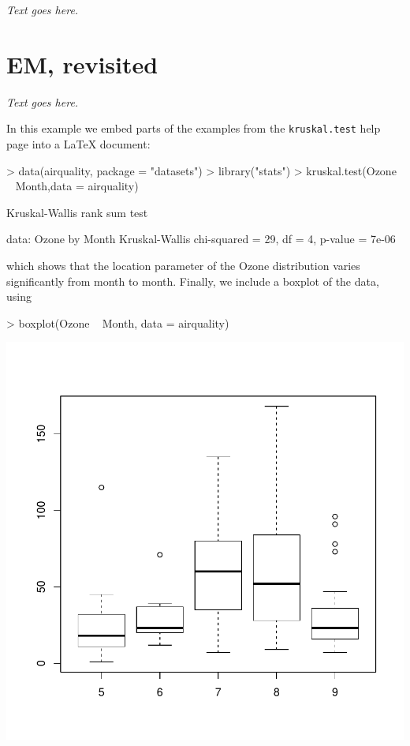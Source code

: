 \documentclass[final]{siamart171218}
\begin{document}
{\em Text goes here.}

\section{EM, revisited}

{\em Text goes here.}

In this example we embed parts of the examples from the
\texttt{kruskal.test} help page into a \LaTeX{} document:
\begin{Schunk}
\begin{Sinput}
> data(airquality, package = "datasets")
> library("stats")
> kruskal.test(Ozone ~ Month,data = airquality)
\end{Sinput}
\begin{Soutput}
	Kruskal-Wallis rank sum test

data:  Ozone by Month
Kruskal-Wallis chi-squared = 29, df = 4, p-value = 7e-06
\end{Soutput}
\end{Schunk}

which shows that the location parameter of the Ozone distribution
varies significantly from month to month. Finally, we include a
boxplot of the data, using
\begin{Schunk}
\begin{Sinput}
> boxplot(Ozone ~ Month, data = airquality)
\end{Sinput}
\end{Schunk}
\begin{center} 
\includegraphics{algorithms-004}
\end{center}
\end{document}
